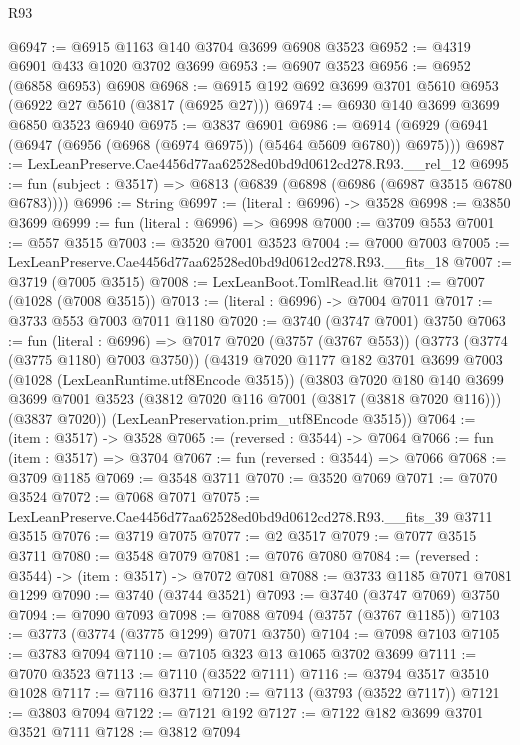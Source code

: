 \begin{lexlean}{R93}
\begin{coremodule}
@6947 := @6915 @1163 @140 @3704 @3699 @6908 @3523
@6952 := @4319 @6901 @433 @1020 @3702 @3699
@6953 := @6907 @3523
@6956 := @6952 (@6858 @6953) @6908
@6968 := @6915 @192 @692 @3699 @3701 @5610 @6953 (@6922 @27 @5610 (@3817 (@6925 @27)))
@6974 := @6930 @140 @3699 @3699 @6850 @3523 @6940
@6975 := @3837 @6901
@6986 := @6914 (@6929 (@6941 (@6947 (@6956 (@6968 (@6974 @6975)) (@5464 @5609 @6780)) @6975)))
@6987 := LexLeanPreserve.Cae4456d77aa62528ed0bd9d0612cd278.R93.__rel_12
@6995 := fun (subject : @3517) => @6813 (@6839 (@6898 (@6986 (@6987 @3515 @6780 @6783))))
@6996 := String
@6997 := (literal : @6996) -> @3528
@6998 := @3850 @3699
@6999 := fun (literal : @6996) => @6998
@7000 := @3709 @553
@7001 := @557 @3515
@7003 := @3520 @7001 @3523
@7004 := @7000 @7003
@7005 := LexLeanPreserve.Cae4456d77aa62528ed0bd9d0612cd278.R93.__fits_18
@7007 := @3719 (@7005 @3515)
@7008 := LexLeanBoot.TomlRead.lit
@7011 := @7007 (@1028 (@7008 @3515))
@7013 := (literal : @6996) -> @7004 @7011
@7017 := @3733 @553 @7003 @7011 @1180
@7020 := @3740 (@3747 @7001) @3750
@7063 := fun (literal : @6996) =>
  @7017
    @7020
    (@3757 (@3767 @553))
    (@3773 (@3774 (@3775 @1180) @7003 @3750))
    (@4319
      @7020
      @1177
      @182
      @3701
      @3699
      @7003
      (@1028 (LexLeanRuntime.utf8Encode @3515))
      (@3803
        @7020
        @180
        @140
        @3699
        @3699
        @7001
        @3523
        (@3812 @7020 @116 @7001 (@3817 (@3818 @7020 @116)))
        (@3837 @7020))
      (LexLeanPreservation.prim_utf8Encode @3515))
@7064 := (item : @3517) -> @3528
@7065 := (reversed : @3544) -> @7064
@7066 := fun (item : @3517) => @3704
@7067 := fun (reversed : @3544) => @7066
@7068 := @3709 @1185
@7069 := @3548 @3711
@7070 := @3520 @7069
@7071 := @7070 @3524
@7072 := @7068 @7071
@7075 := LexLeanPreserve.Cae4456d77aa62528ed0bd9d0612cd278.R93.__fits_39 @3711 @3515
@7076 := @3719 @7075
@7077 := @2 @3517
@7079 := @7077 @3515 @3711
@7080 := @3548 @7079
@7081 := @7076 @7080
@7084 := (reversed : @3544) -> (item : @3517) -> @7072 @7081
@7088 := @3733 @1185 @7071 @7081 @1299
@7090 := @3740 (@3744 @3521)
@7093 := @3740 (@3747 @7069) @3750
@7094 := @7090 @7093
@7098 := @7088 @7094 (@3757 (@3767 @1185))
@7103 := @3773 (@3774 (@3775 @1299) @7071 @3750)
@7104 := @7098 @7103
@7105 := @3783 @7094
@7110 := @7105 @323 @13 @1065 @3702 @3699
@7111 := @7070 @3523
@7113 := @7110 (@3522 @7111)
@7116 := @3794 @3517 @3510 @1028
@7117 := @7116 @3711
@7120 := @7113 (@3793 (@3522 @7117))
@7121 := @3803 @7094
@7122 := @7121 @192
@7127 := @7122 @182 @3699 @3701 @3521 @7111
@7128 := @3812 @7094

\end{coremodule}
\end{lexlean}
